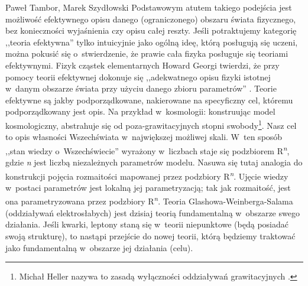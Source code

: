 \begin{artplenv2auth}{Paweł Tambor, Marek Szydłowski}
Podstawowym atutem takiego podejścia jest możliwość efektywnego opisu danego (ograniczonego) obszaru świata fizycznego, bez konieczności wyjaśnienia czy opisu całej reszty. Jeśli potraktujemy kategorię ,,teoria efektywna'' tylko intuicyjnie jako ogólną ideę, którą posługują się uczeni, można pokusić się o~stwierdzenie, że prawie cała fizyka posługuje się teoriami efektywnymi. Fizyk cząstek elementarnych Howard Georgi twierdzi, że przy pomocy teorii efektywnej dokonuje się ,,adekwatnego opisu fizyki istotnej w~danym obszarze świata przy użyciu danego zbioru parametrów''
\parencite[][]{georgi_effective_1993}. %
 Teorie efektywne są jakby podporządkowane, nakierowane na specyficzny cel, któremu podporządkowany jest opis. Na przykład w~kosmologii: konstruując model kosmologiczny, abstrahuje się od poza-grawitacyjnych stopni swobody\footnote{Michał Heller nazywa to zasadą wyłączności oddziaływań grawitacyjnych 
\parencite[][s.~60]{heller_ewolucyjny_1969}.%
}. Nasz cel to opis własności Wszechświata w~największej możliwej skali. W~ten sposób ,,stan wiedzy o~Wszechświecie'' wyrażony w~liczbach staje się podzbiorem R\textsuperscript{\textit{n}}, gdzie \textit{n} jest liczbą niezależnych parametrów modelu. Nasuwa się tutaj analogia do konstrukcji pojęcia rozmaitości mapowanej przez podzbiory R\textsuperscript{\textit{n}}. Ujęcie wiedzy w~postaci parametrów jest lokalną jej parametryzacją; tak jak rozmaitość, jest ona parametryzowana przez podzbiory R\textsuperscript{\textit{n}}. Teoria Glashowa-Weinberga-Salama (oddziaływań elektrosłabych) jest dzisiaj teorią fundamentalną w~obszarze swego działania. Jeśli kwarki, leptony staną się w~teorii niepunktowe (będą posiadać swoją strukturę), to nastąpi przejście do nowej teorii, którą będziemy traktować jako fundamentalną w~obszarze jej działania (celu).


\end{artplenv2auth}
